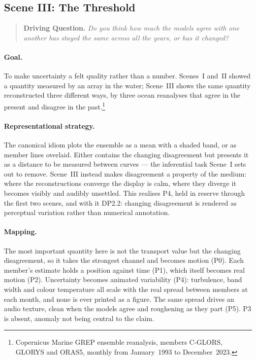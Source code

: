 \subsection{Scene III: The Threshold}
\label{subsec:scene-threshold}

\begin{quote}
\textbf{Driving Question.} \emph{Do you think how much the models agree with one another has stayed the same across all the years, or has it changed?}
\end{quote}



\paragraph{Goal.} To make uncertainty a felt quality rather than a number. Scenes~I and~II showed a quantity measured by an array in the water; Scene~III shows the same quantity reconstructed three different ways, by three ocean reanalyses that agree in the present and disagree in the past.\footnote{Copernicus Marine GREP ensemble reanalysis, members C-GLORS, GLORYS and ORAS5, monthly from January~1993 to December~2023.}

\paragraph{Representational strategy.} The canonical idiom plots the ensemble as a mean with a shaded band, or as member lines overlaid. Either contains the changing disagreement but presents it as a distance to be measured between curves --- the inferential task Scene~I sets out to remove. Scene~III instead makes disagreement a property of the medium: where the reconstructions converge the display is calm, where they diverge it becomes visibly and audibly unsettled. This realises P4, held in reserve through the first two scenes, and with it DP2.2: changing disagreement is rendered as perceptual variation rather than numerical annotation.

\paragraph{Mapping.} The most important quantity here is not the transport value but the changing disagreement, so it takes the strongest channel and becomes motion (P0). Each member's estimate holds a position against time (P1), which itself becomes real motion (P2). Uncertainty becomes animated variability (P4): turbulence, band width and colour temperature all scale with the real spread between members at each month, and none is ever printed as a figure. The same spread drives an audio texture, clean when the models agree and roughening as they part (P5). P3 is absent, anomaly not being central to the claim.


